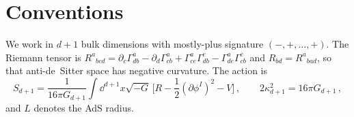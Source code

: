 \section{Conventions}
\label{app:conventions}

We work in $d+1$ bulk dimensions with mostly-plus signature $(-,+,\dots,+)$. The Riemann tensor is
$R^a{}_{bcd} = \partial_c\Gamma^a_{db} - \partial_d\Gamma^a_{cb} + \Gamma^a_{ce}\Gamma^e_{db} - \Gamma^a_{de}\Gamma^e_{cb}$
and $R_{bd} = R^a{}_{bad}$, so that anti-de~Sitter space has negative curvature. The action is
\begin{equation}
	S_{d+1} = \frac{1}{16\pi G_{d+1}}\int\dd^{d+1}x\sqrt{-G}\,\Big[R - \frac12(\partial\phi^I)^2 - V\Big]\,,
	\qquad 2\kappa_{d+1}^2 = 16\pi G_{d+1}\,,
\end{equation}
and $L$ denotes the AdS radius. 
